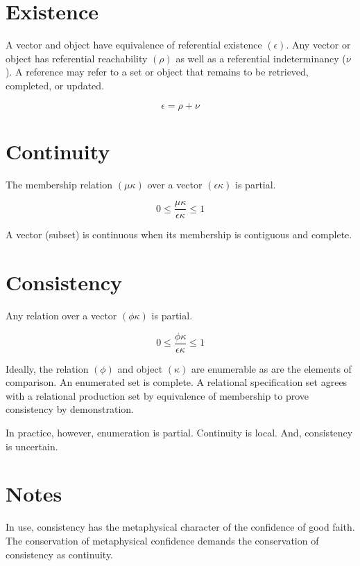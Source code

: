 \documentclass[12pt,twocolumn]{article}
\begin{document}
\section{Existence}

A vector and object have equivalence of referential existence
\((\epsilon)\).  Any vector or object has referential reachability
\((\rho)\) as well as a referential indeterminancy (\(\nu\)).  A
reference may refer to a set or object that remains to be retrieved,
completed, or updated.

$$
 {\epsilon} =  {\rho} + {\nu}
$$

\section{Continuity}

The membership relation \((\mu\kappa)\) over a vector
\((\epsilon\kappa)\) is partial.

$$
 0 \le \frac{\mu\kappa}{\epsilon\kappa} \le 1
$$

A vector (subset) is continuous when its membership is contiguous and
complete.

\section{Consistency}

Any relation over a vector \((\phi\kappa)\) is partial.

$$
 0 \le \frac{\phi\kappa}{\epsilon\kappa} \le 1
$$

Ideally, the relation \((\phi)\) and object \((\kappa)\) are
enumerable as are the elements of comparison.  An enumerated set is
complete.  A relational specification set agrees with a relational
production set by equivalence of membership to prove consistency by
demonstration.

In practice, however, enumeration is partial.  Continuity is local.
And, consistency is uncertain.

\section{Notes}

In use, consistency has the metaphysical character of the confidence
of good faith.  The conservation of metaphysical confidence demands
the conservation of consistency as continuity.


\break
\appendix



\end{document}
